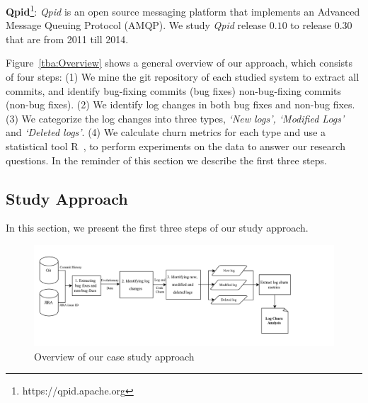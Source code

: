 {\textbf{Qpid}\footnote[3]{https://qpid.apache.org}}: \emph{Qpid} is an open source messaging platform that implements an Advanced Message Queuing Protocol (AMQP). We study \emph{Qpid} release $0.10$ to release $0.30$ that are from 2011 till 2014.


Figure~\ref{tba:Overview} shows a general overview of our approach, which consists of four steps: (1) We mine the git repository of each studied system to extract all commits, and identify bug-fixing commits (bug fixes) non-bug-fixing commits (non-bug fixes). (2) We identify log changes in both bug fixes and non-bug fixes. (3) We categorize the log changes into three types, \textsl{`New logs', `Modified Logs'} and \textsl{`Deleted logs'}. (4) We calculate churn metrics for each type and use a statistical tool R~\cite{ihaka1996r}, to perform experiments on the data to answer our research questions.  In the reminder of this section we describe the first three steps.



\subsection{Study Approach}

In this section, we present the first three steps of our study approach. 
\begin{figure}[t]
	\centering
	\includegraphics[scale=0.45]{MethdologyICESEM}
	\caption{Overview of our case study approach }
	\label{fig:MethodologyICSME}
\end{figure}

